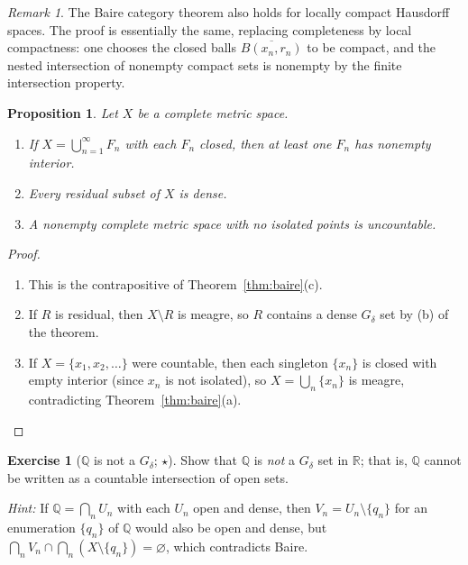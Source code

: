\documentclass[a4paper,12pt]{book}
\newcommand{\Q}{\mathbb{Q}}
\newcommand{\R}{\mathbb{R}}
\theoremstyle{definition}
\newtheorem{exercise}{Exercise}[chapter]
\theoremstyle{plain}
\newtheorem{proposition}[definition]{Proposition}
\theoremstyle{remark}
\newtheorem{remark}[definition]{Remark}
\begin{document}
\begin{remark}\label{rem:baire-lcs}
The Baire category theorem also holds for locally compact Hausdorff spaces. The proof
is essentially the same, replacing completeness by local compactness: one chooses
the closed balls $\overline{B(x_n,r_n)}$ to be compact, and the nested intersection
of nonempty compact sets is nonempty by the finite intersection property.
\end{remark}

\begin{proposition}\label{prop:baire-consequences}
Let $X$ be a complete metric space.
\begin{enumerate}[label=(\roman*)]
  \item{} If $X = \bigcup_{n=1}^{\infty} F_n$
    with each $F_n$ closed, then at least one $F_n$ has nonempty interior.
  \item Every residual subset of $X$ is dense.
  \item A nonempty complete metric space with no isolated points is uncountable.
\end{enumerate}
\end{proposition}

\begin{proof}
\begin{enumerate}[label=(\roman*)]
  \item This is the contrapositive of Theorem~\ref{thm:baire}(c).
  \item If $R$ is residual, then $X \setminus R$ is meagre, so $R$ contains a dense
    $G_\delta$ set by (b) of the theorem.
  \item If $X = \{x_1, x_2, \ldots\}$ were countable, then each singleton $\{x_n\}$
    is closed with empty interior (since $x_n$ is not isolated), so
    $X = \bigcup_n \{x_n\}$ is meagre, contradicting Theorem~\ref{thm:baire}(a).
    \qedhere
\end{enumerate}
\end{proof}

\begin{exercise}[$\Q$ is not a $G_\delta$; $\star$]\label{ex:baire-Q-not-Gdelta}
Show that $\Q$ is \emph{not} a $G_\delta$ set in $\R$; that is, $\Q$ cannot be written
as a countable intersection of open sets.

\noindent\textit{Hint:} If $\Q = \bigcap_n U_n$ with each $U_n$ open and dense, then
$V_n = U_n \setminus \{q_n\}$ for an enumeration $\{q_n\}$ of $\Q$ would also be open
and dense, but $\bigcap_n V_n \cap \bigcap_n (X\setminus\{q_n\}) = \varnothing$,
which contradicts Baire.
\end{exercise}
\end{document}
